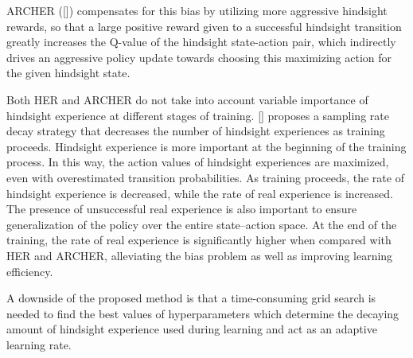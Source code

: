 \documentclass[conference]{IEEEtran}
\begin{document}
ARCHER ([\cite{lanka2018archer}]) compensates for this bias by utilizing more aggressive hindsight rewards, so that a large positive reward given to a successful hindsight transition
greatly increases the Q-value of the hindsight state-action pair, which indirectly drives an aggressive policy update towards choosing this maximizing action for the given hindsight
state.

Both HER and ARCHER do not take into account variable importance of hindsight experience at different stages of training. [\cite{vecchietti2020sampling}] proposes a sampling rate decay strategy that decreases the number of hindsight experiences as training proceeds. Hindsight experience is more important at the beginning of the training process. In this way, the action values of hindsight experiences are maximized, even with overestimated transition probabilities. As training proceeds, the rate of hindsight experience is decreased, while the rate of real experience is increased. The presence of unsuccessful real experience is also important to ensure generalization of the policy over the entire state–action space. At the end of the training, the rate of real experience is significantly higher when compared with HER and ARCHER, alleviating the bias problem as well as improving learning efficiency.

A downside of the proposed method is that a time-consuming grid search is needed to find the best values of hyperparameters which determine the decaying amount of hindsight experience used during learning and act as an adaptive learning rate.
\end{document}
